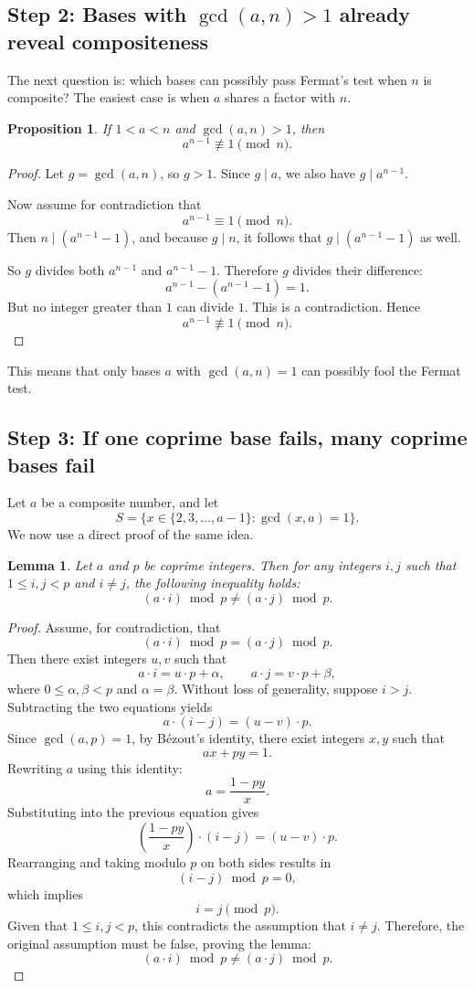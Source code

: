 \documentclass[12pt,a4paper]{report}
\newtheorem{lemma}{Lemma}[chapter]
\newtheorem{proposition}{Proposition}[chapter]
\begin{document}
\subsection{Step 2: Bases with \texorpdfstring{$\gcd(a,n)>1$}{gcd(a,n)>1} already reveal compositeness}
The next question is: which bases can possibly pass Fermat's test when \(n\) is composite? The easiest case is when \(a\) shares a factor with \(n\).

\begin{proposition}
If \(1<a<n\) and \(\gcd(a,n)>1\), then
\[
a^{n-1} \not\equiv 1 \pmod{n}.
\]
\end{proposition}

\begin{proof}
Let \(g=\gcd(a,n)\), so \(g>1\). Since \(g\mid a\), we also have \(g\mid a^{n-1}\).

Now assume for contradiction that
\[
a^{n-1} \equiv 1 \pmod{n}.
\]
Then \(n\mid (a^{n-1}-1)\), and because \(g\mid n\), it follows that \(g\mid (a^{n-1}-1)\) as well.

So \(g\) divides both \(a^{n-1}\) and \(a^{n-1}-1\). Therefore \(g\) divides their difference:
\[
a^{n-1}-(a^{n-1}-1)=1.
\]
But no integer greater than \(1\) can divide \(1\). This is a contradiction. Hence
\[
a^{n-1} \not\equiv 1 \pmod{n}.
\]
\end{proof}

This means that only bases \(a\) with \(\gcd(a,n)=1\) can possibly fool the Fermat test.

\subsection{Step 3: If one coprime base fails, many coprime bases fail}
Let \(a\) be a composite number, and let
\[
S=\{x\in\{2,3,\dots,a-1\} : \gcd(x,a)=1\}.
\]
We now use a direct proof of the same idea.

\begin{lemma}
Let \(a\) and \(p\) be coprime integers. Then for any integers \(i,j\) such that \(1\le i,j<p\) and \(i\neq j\), the following inequality holds:
\[
(a\cdot i)\bmod p \neq (a\cdot j)\bmod p.
\]
\end{lemma}

\begin{proof}
Assume, for contradiction, that
\[
(a\cdot i)\bmod p = (a\cdot j)\bmod p.
\]
Then there exist integers \(u,v\) such that
\[
a\cdot i =u\cdot p +\alpha,
\qquad
a\cdot j =v\cdot p +\beta,
\]
where \(0\le \alpha,\beta<p\) and \(\alpha=\beta\). Without loss of generality, suppose \(i>j\). Subtracting the two equations yields
\[
a\cdot (i-j) = (u-v)\cdot p.
\]
Since \(\gcd(a,p)=1\), by Bézout's identity, there exist integers \(x,y\) such that
\[
ax+py=1.
\]
Rewriting \(a\) using this identity:
\[
a=\frac{1-py}{x}.
\]
Substituting into the previous equation gives
\[
\left(\frac{1-py}{x}\right)\cdot (i-j)=(u-v)\cdot p.
\]
Rearranging and taking modulo \(p\) on both sides results in
\[
(i-j)\bmod p=0,
\]
which implies
\[
i=j \pmod p.
\]
Given that \(1\le i,j<p\), this contradicts the assumption that \(i\neq j\). Therefore, the original assumption must be false, proving the lemma:
\[
(a\cdot i)\bmod p \neq (a\cdot j)\bmod p.
\]
\end{proof}
\end{document}
